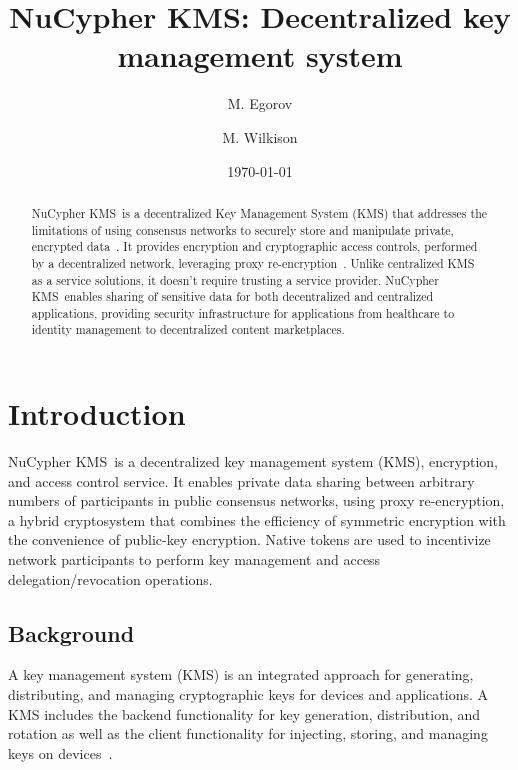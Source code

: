 \documentclass[longbibliography]{revtex4-1}
\newcommand{\kms}{NuCypher KMS}
\begin{document}
\title{\kms: Decentralized key management system}

\author{M. Egorov}
\author{M. Wilkison}


\begin{abstract}
    \kms~is a decentralized Key Management System (KMS) that addresses the limitations of using consensus
    networks to securely store and manipulate private, encrypted data~\cite{cryptoeprint:2017:201}.
    It provides encryption and cryptographic access controls, performed by a decentralized network,
    leveraging proxy re-encryption~\cite{wiki:pre}.
    Unlike centralized KMS as a service solutions, it doesn't require trusting a service provider.
    \kms~enables sharing of sensitive data for both decentralized and centralized applications,
    providing security infrastructure for applications from healthcare to identity management to decentralized content marketplaces.
\end{abstract}

\date{\today}
\maketitle

\tableofcontents


\section{Introduction}

\kms~is a decentralized key management system (KMS), encryption, and access control service.
It enables private data sharing between arbitrary numbers of participants in public consensus networks,
using proxy re-encryption, a hybrid cryptosystem that combines the efficiency of symmetric encryption with the convenience of public-key encryption.
Native tokens are used to incentivize network participants to perform key management and access delegation/revocation operations.

\subsection{Background}
A key management system (KMS) is an integrated approach for generating, distributing, and managing cryptographic keys for devices and
applications.
A KMS includes the backend functionality for key generation, distribution, and rotation as well as the client functionality for
injecting, storing, and managing keys on devices~\cite{wiki:kms}.
\end{document}
